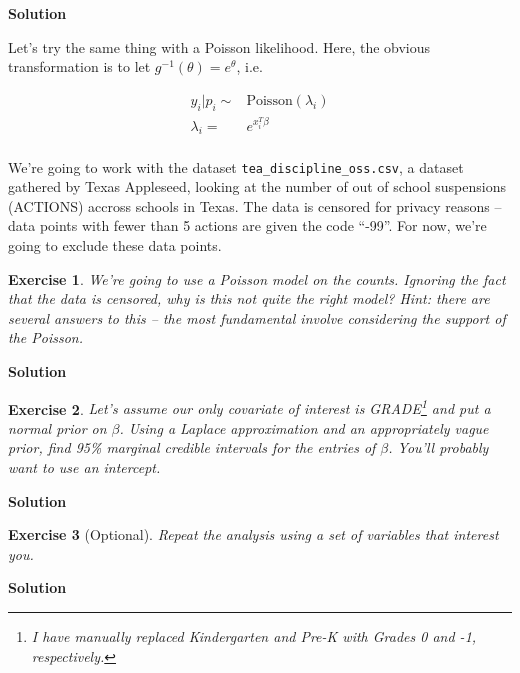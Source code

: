 \documentclass[twoside]{article}
\newcounter{lecnum}
\newtheorem{exercise}{Exercise}[lecnum]
\begin{document}
{\color{blue}
	\textbf{Solution}
	
	
} %


  Let's try the same thing with a Poisson likelihood. Here, the obvious transformation is to let $g^{-1}(\theta) = e^{\theta}$, i.e.

$$\begin{aligned}
  y_i|p_i \sim& \mbox{Poisson}(\lambda_i)\\
  \lambda_i =& e^{x_i^T\beta}\\
\end{aligned}$$

  We're going to work with the dataset \texttt{tea\_discipline\_oss.csv}, a dataset gathered by Texas Appleseed, looking at the number of out of school suspensions (ACTIONS) accross schools in Texas. The data is censored for privacy reasons -- data points with fewer than 5 actions are given the code ``-99''. For now, we're going to exclude these data points. 

  \begin{exercise}
    We're going to use a Poisson model on the counts. Ignoring the fact that the data is censored, why is this not quite the right model? \textit{Hint: there are several answers to this -- the most fundamental involve considering the support of the Poisson}.
  \end{exercise}

{\color{blue}
	\textbf{Solution}
	
	
} %

  
  \begin{exercise}
    Let's assume our only covariate of interest is GRADE\footnote{I have manually replaced Kindergarten and Pre-K with Grades 0 and -1, respectively.} and put a normal prior on $\beta$. Using a Laplace approximation and an appropriately vague prior, find  95\% marginal credible intervals for the entries of $\beta$. You'll probably want to use an intercept.
  \end{exercise}

{\color{blue}
	\textbf{Solution}
	
	
} %


  \begin{exercise}[Optional]
    Repeat the analysis using a set of variables that interest you.
  \end{exercise}

{\color{blue}
	\textbf{Solution}
	
	
} %
\end{document}
